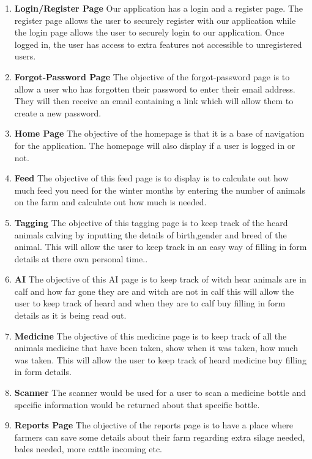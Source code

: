 \documentclass[12pt,a4paper,oneside,openany]{book}
\begin{document}
\begin{enumerate}
    \item \textbf{Login/Register Page} Our application has a login and a register page. The register page allows the user to securely register with our application while the login page allows the user to securely login to our application. Once logged in, the user has access to extra features not accessible to unregistered users.
    
    \item \textbf{Forgot-Password Page}
    The objective of the forgot-password page is to allow a user who has forgotten their password to enter their email address. They will then receive an email containing a link which will allow them to create a new password.

    \item \textbf{Home Page} 
    The objective of the homepage is that it is a base of navigation for the application. The homepage will also display if a user is logged in or not.
    
    \item \textbf{Feed} 
    The objective of this feed page is to display is to calculate out how much feed you need for the winter months by entering the number of animals on the farm and calculate out how much is needed.
    
    \item \textbf{Tagging} 
    The objective of this tagging page is to keep track of the heard animals calving by inputting the details of birth,gender and breed of the animal. This will allow the user to keep track in an easy way of filling in form details at there own personal time..
    
     \item \textbf{AI}
    The objective of this AI page is to keep track of witch hear animals are in calf and how far gone they are and witch are not in calf this will allow the user to keep track of heard and when they are to calf buy filling in form details as it is being read out.
     
     \item \textbf{Medicine}
     The objective of this medicine page is to keep track of all the animals medicine that have been taken, show when it was taken, how much was taken. This will allow the user to keep track of heard medicine buy filling in form details.
     
     \item \textbf{Scanner}
     The scanner would be used for a user to scan a medicine bottle and specific information would be returned about that specific bottle.
     
    \item \textbf{Reports Page} 
    The objective of the reports page is to have a place where farmers can save some details about their farm regarding extra silage needed, bales needed, more cattle incoming etc.
    
\end{enumerate}
\end{document}
